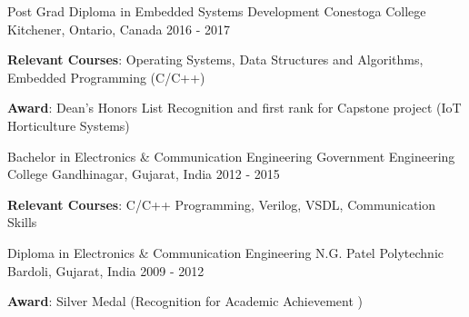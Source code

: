 

\begin{cventries}

  \cventry
    {Post Grad Diploma in Embedded Systems Development} %
    {Conestoga College} %
    {Kitchener, Ontario, Canada} %
    {2016 - 2017} %
    {
      \begin{cvitems} %
        \item {\textbf{Relevant Courses}: Operating Systems, Data Structures and Algorithms, Embedded Programming (C/C++)}
        \item {\textbf{Award}: Dean's Honors List Recognition and first rank for Capstone project (IoT Horticulture Systems)}
      \end{cvitems}
    }

  \cventry
    {Bachelor in Electronics \& Communication Engineering} %
    {Government Engineering College } %
    {Gandhinagar, Gujarat, India} %
    {2012 - 2015} %
    {
      \begin{cvitems} %
       \item {\textbf{Relevant Courses}: C/C++ Programming, Verilog, VSDL, Communication Skills }
      \end{cvitems}
    }

  \cventry
    {Diploma in Electronics \& Communication Engineering} %
    {N.G. Patel Polytechnic } %
    {Bardoli, Gujarat, India} %
    {2009 - 2012} %
    {
      \begin{cvitems} %
         \item {\textbf{Award}: Silver Medal (Recognition for Academic Achievement )}
      \end{cvitems}
    }

\end{cventries}
